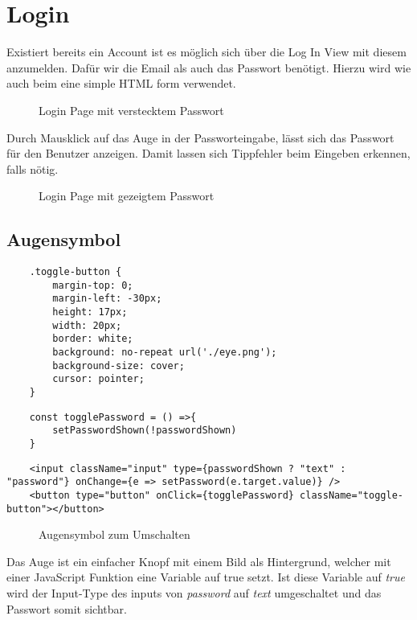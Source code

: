 \pagebreak
\section{Login}
\label{login}

Existiert bereits ein Account ist es möglich sich über die Log In View mit diesem anzumelden. Dafür 
wir die Email als auch das Passwort benötigt. Hierzu wird wie auch beim  eine 
simple HTML form verwendet. 

\begin{figure}[H]
    \begin{center}
      \caption{Login Page mit verstecktem Passwort}
    \end{center}
\end{figure}

Durch Mausklick auf das Auge in der Passworteingabe, lässt sich das Passwort für den Benutzer
anzeigen. Damit lassen sich Tippfehler beim Eingeben erkennen, falls nötig. 

\begin{figure}[H]
    \begin{center}
      \caption{Login Page mit gezeigtem Passwort}
    \end{center}
\end{figure}

\subsection{Augensymbol}

\begin{lstlisting}
    .toggle-button {
        margin-top: 0;
        margin-left: -30px;
        height: 17px;
        width: 20px;
        border: white;
        background: no-repeat url('./eye.png');
        background-size: cover;
        cursor: pointer;
    }
\end{lstlisting}
\begin{lstlisting}
    const togglePassword = () =>{
        setPasswordShown(!passwordShown)
    }
\end{lstlisting}
\begin{lstlisting}
    <input className="input" type={passwordShown ? "text" : "password"} onChange={e => setPassword(e.target.value)} />
    <button type="button" onClick={togglePassword} className="toggle-button"></button>
\end{lstlisting}

\begin{figure}[H]
    \begin{center}
      \caption{Augensymbol zum Umschalten}
    \end{center}
\end{figure}

Das Auge ist ein einfacher Knopf mit einem Bild als Hintergrund, welcher mit einer JavaScript Funktion 
eine Variable auf true setzt. Ist diese Variable auf \textit{true} wird der Input-Type des inputs von
\textit{password} auf \textit{text} umgeschaltet und das Passwort somit sichtbar. 
